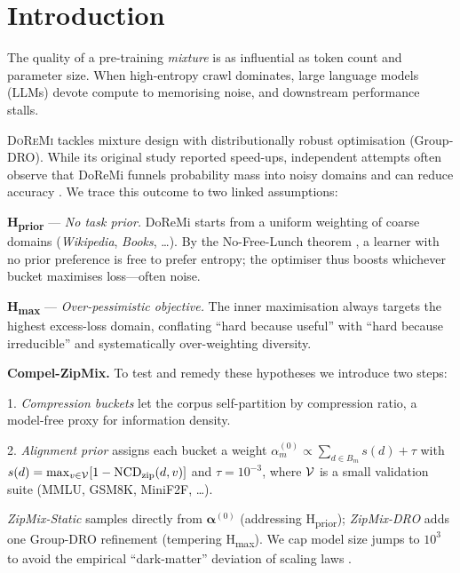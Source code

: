 \section{Introduction}\label{sec:intro}

The quality of a pre-training \emph{mixture} is as influential as token count and parameter size.
When high-entropy crawl dominates, large language models (LLMs) devote compute to memorising noise, and downstream performance stalls.

\textsc{DoReMi} tackles mixture design with distributionally robust optimisation (Group-DRO).
While its original study reported speed-ups, independent attempts often observe that DoReMi funnels probability mass into noisy domains and can reduce accuracy \citep{fan2023doge}.
We trace this outcome to two linked assumptions:

\textbf{H\textsubscript{prior}} — \emph{No task prior.} DoReMi starts from a uniform weighting of coarse domains (\emph{Wikipedia}, \emph{Books}, …).
By the No-Free-Lunch theorem \citep{wolpert1997no}, a learner with no prior preference is free to prefer entropy; the optimiser thus boosts whichever bucket maximises loss—often noise.

\textbf{H\textsubscript{max}} — \emph{Over-pessimistic objective.} The inner maximisation always targets the highest excess-loss domain, conflating ``hard because useful'' with ``hard because irreducible'' and systematically over-weighting diversity.

\medskip
\textbf{Compel-ZipMix.} To test and remedy these hypotheses we introduce two steps:

1.
\emph{Compression buckets} let the corpus self-partition by compression ratio, a model-free proxy for information density.

2.
\emph{Alignment prior} assigns each bucket a weight $\alpha^{(0)}_m\propto\sum_{d\in B_m}s(d)+\tau$ with $s(d)=\max_{v\in\mathcal{V}}[1-\text{NCD}_{\text{zip}}(d,v)]$ and $\tau=10^{-3}$, where $\mathcal{V}$ is a small validation suite (MMLU, GSM8K, MiniF2F, …).

\emph{ZipMix-Static} samples directly from $\boldsymbol{\alpha}^{(0)}$ (addressing H\textsubscript{prior}); \emph{ZipMix-DRO} adds one Group-DRO refinement (tempering H\textsubscript{max}).
We cap model size jumps to $10^{3}$ to avoid the empirical ``dark-matter'' deviation of scaling laws \citep{gpt4report,schaeffer2024predictive}.

